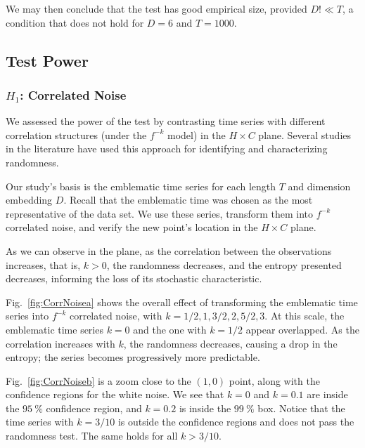 \documentclass[alpha-refs]{wiley-article}
\begin{document}
We may then conclude that the test has good empirical size, provided $D!\ll T$, a condition that does not hold for $D=6$ and $T=1000$.


\subsection{Test Power}

\subsubsection{$H_1$: Correlated Noise}

We assessed the power of the test by contrasting time series with different correlation structures (under the $f^{-k}$ model) in the $H \times C$ plane.
Several studies in the literature have used this approach for identifying and characterizing randomness.

Our study's basis is the emblematic time series for each length $T$ and dimension embedding $D$.
Recall that the emblematic time was chosen as the most representative of the data set.
We use these series, transform them into $f^{-k}$ correlated noise, and verify the new point's location in the $H\times C$ plane.

As we can observe in the plane, as the correlation between the observations increases, that is, $k > 0$, the randomness decreases, and the entropy presented decreases, informing the loss of its stochastic characteristic.

Fig.~\ref{fig:CorrNoisea} shows the overall effect of transforming the emblematic time series into $f^{-k}$ correlated noise, with $k=1/2,1,3/2,2,5/2,3$.
At this scale, the emblematic time series $k=0$ and the one with $k=1/2$ appear overlapped.
As the correlation increases with $k$, the randomness decreases, causing a drop in the entropy; the series becomes progressively more predictable.

Fig.~\ref{fig:CorrNoiseb} is a zoom close to the $(1,0)$ point, along with the confidence regions for the white noise.
We see that $ k = 0 $ and $ k = 0.1 $ are inside the $\SI{95}{\percent}$ confidence region, and $ k = 0.2 $ is inside the $\SI{99}{\percent}$ box.
Notice that the time series with $k=3/10$ is outside the confidence regions and does not pass the randomness test.
The same holds for all $k>3/10$.
\end{document}

